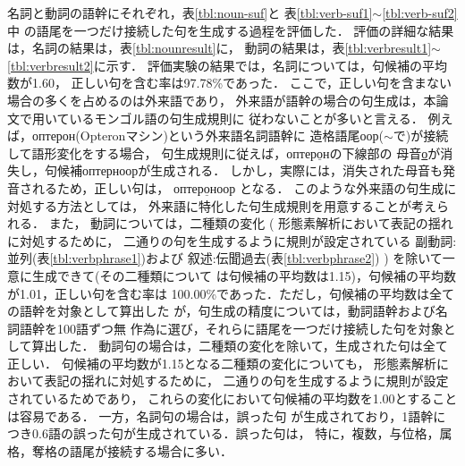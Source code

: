 名詞と動詞の語幹にそれぞれ，表\ref{tbl:noun-suf}と
表\ref{tbl:verb-suf1}$\sim$\ref{tbl:verb-suf2}中
の語尾を一つだけ接続した句を生成する過程を評価した．
評価の詳細な結果は，名詞の結果は，表\ref{tbl:nounresult}に，
動詞の結果は，表\ref{tbl:verbresult1}$\sim$\ref{tbl:verbresult2}に示す．
評価実験の結果では，名詞については，句候補の平均数が1.60，
正しい句を含む率は97.78\%であった．
ここで，正しい句を含まない場合の多くを占めるのは外来語であり，
外来語が語幹の場合の句生成は，本論文で用いているモンゴル語の句生成規則に
従わないことが多いと言える．
例えば，${о\!\!п\!\!т\!\!е\!\!р\!\!о\!\!н}$(Opteronマシン)という外来語名詞語幹に
造格語尾${о\!\!о\!\!р}$($\sim$で)が接続して語形変化をする場合，
句生成規則に従えば，${о\!\!п\!\!т\!\!е\!\!р\!\!\underline{о}\!\!н}$の下線部の
母音{\underline{о}}が消失し，句候補${о\!\!п\!\!т\!\!е\!\!р\!\!н\!\!о\!\!о\!\!р}$が生成される．
しかし，実際には，消失された母音も発音されるため，正しい句は，
${о\!\!п\!\!т\!\!е\!\!р\!\!\underline{о}\!\!н\!\!о\!\!о\!\!р}$
となる．
このような外来語の句生成に対処する方法としては，
外来語に特化した句生成規則を用意することが考えられる．
また，
動詞については，二種類の変化
(
形態素解析において表記の揺れに対処するために，
二通りの句を生成するように規則が設定されている
副動詞:並列(表\ref{tbl:verbphrase1})および
叙述:伝聞過去(表\ref{tbl:verbphrase2})
)
を除いて一意に生成できて(その二種類について
は句候補の平均数は1.15)，句候補の平均数が1.01，正しい句を含む率は
100.00\%であった．ただし，句候補の平均数は全ての語幹を対象として算出した
が，句生成の精度については，動詞語幹および名詞語幹を100語ずつ無
作為に選び，それらに語尾を一つだけ接続した句を対象として算出した．
動詞句の場合は，二種類の変化を除いて，生成された句は全て正しい．
句候補の平均数が1.15となる二種類の変化についても，
形態素解析において表記の揺れに対処するために，
二通りの句を生成するように規則が設定されているためであり，
これらの変化において句候補の平均数を1.00とすることは容易である．
一方，名詞句の場合は，誤った句
が生成されており，1語幹につき0.6語の誤った句が生成されている．誤った句は，
特に，複数，与位格，属格，奪格の語尾が接続する場合に多い．




